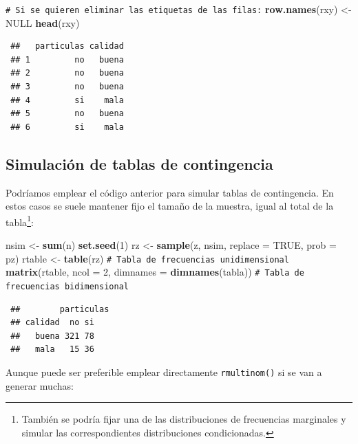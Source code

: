 \documentclass[
  spanish,
  10pt,
]{book}
\newenvironment{Shaded}{\begin{snugshade}}{\end{snugshade}}
\newcommand{\AttributeTok}[1]{\textcolor[rgb]{0.13,0.29,0.53}{#1}}
\newcommand{\CommentTok}[1]{\textcolor[rgb]{0.56,0.35,0.01}{\textit{#1}}}
\newcommand{\ConstantTok}[1]{\textcolor[rgb]{0.56,0.35,0.01}{#1}}
\newcommand{\DecValTok}[1]{\textcolor[rgb]{0.00,0.00,0.81}{#1}}
\newcommand{\FunctionTok}[1]{\textcolor[rgb]{0.13,0.29,0.53}{\textbf{#1}}}
\newcommand{\NormalTok}[1]{#1}
\newcommand{\OtherTok}[1]{\textcolor[rgb]{0.56,0.35,0.01}{#1}}
\theoremstyle{break}
\theoremstyle{nonumberplain}
\renewcommand{\CommentTok}[1]{\textcolor[rgb]{0.41,0.41,0.41}{\texttt{#1}}}
\let\oldfootnote\footnote
\renewcommand\footnote[1]{\oldfootnote{\hspace{2mm}#1}}
\begin{document}
\begin{Shaded}
\begin{Highlighting}[]
\CommentTok{\# Si se quieren eliminar las etiquetas de las filas:}
\FunctionTok{row.names}\NormalTok{(rxy) }\OtherTok{\textless{}{-}} \ConstantTok{NULL}
\FunctionTok{head}\NormalTok{(rxy)}
\end{Highlighting}
\end{Shaded}

\begin{verbatim}
 ##   particulas calidad
 ## 1         no   buena
 ## 2         no   buena
 ## 3         no   buena
 ## 4         si    mala
 ## 5         no   buena
 ## 6         si    mala
\end{verbatim}

\subsection{Simulación de tablas de contingencia}\label{simconting}

Podríamos emplear el código anterior para simular tablas de contingencia.
En estos casos se suele mantener fijo el tamaño de la muestra, igual al total de la tabla\footnote{También se podría fijar una de las distribuciones de frecuencias marginales y simular las correspondientes distribuciones condicionadas.}:

\begin{Shaded}
\begin{Highlighting}[]
\NormalTok{nsim }\OtherTok{\textless{}{-}} \FunctionTok{sum}\NormalTok{(n)}
\FunctionTok{set.seed}\NormalTok{(}\DecValTok{1}\NormalTok{)}
\NormalTok{rz }\OtherTok{\textless{}{-}} \FunctionTok{sample}\NormalTok{(z, nsim, }\AttributeTok{replace =} \ConstantTok{TRUE}\NormalTok{, }\AttributeTok{prob =}\NormalTok{ pz)}
\NormalTok{rtable }\OtherTok{\textless{}{-}} \FunctionTok{table}\NormalTok{(rz) }\CommentTok{\# Tabla de frecuencias unidimensional}
\FunctionTok{matrix}\NormalTok{(rtable, }\AttributeTok{ncol =} \DecValTok{2}\NormalTok{, }\AttributeTok{dimnames =} \FunctionTok{dimnames}\NormalTok{(tabla)) }\CommentTok{\# Tabla de frecuencias bidimensional}
\end{Highlighting}
\end{Shaded}

\begin{verbatim}
 ##        particulas
 ## calidad  no si
 ##   buena 321 78
 ##   mala   15 36
\end{verbatim}

Aunque puede ser preferible emplear directamente \texttt{rmultinom()} si se van a generar muchas:
\end{document}
